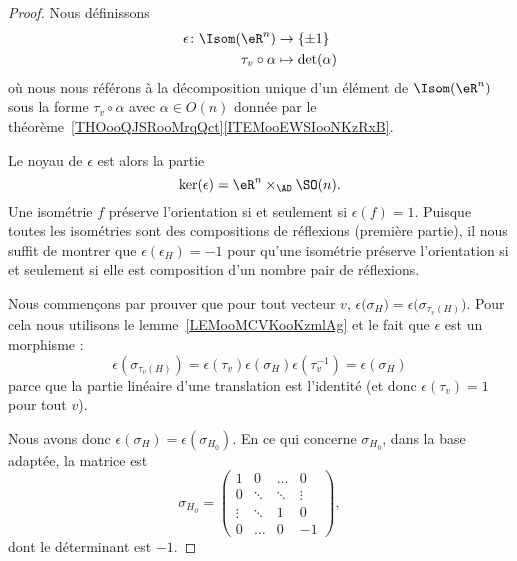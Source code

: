 \begin{proof}
	Nous définissons
	\begin{equation}
		\begin{aligned}
			\epsilon\colon \Isom(\eR^n) & \to \{ \pm 1 \}      \\
			\tau_v\circ \alpha          & \mapsto \det(\alpha)
		\end{aligned}
	\end{equation}
	où nous nous référons à la décomposition unique d'un élément de \( \Isom(\eR^n)\) sous la forme \( \tau_v\circ \alpha\) avec \( \alpha\in O(n)\) donnée par le théorème~\ref{THOooQJSRooMrqQct}\ref{ITEMooEWSIooNKzRxB}.

	Le noyau de \( \epsilon\) est alors la partie
	\begin{equation}
		\ker(\epsilon)=\eR^n\times_{\AD}\SO(n).
	\end{equation}
	Une isométrie \( f\) préserve l'orientation si et seulement si \( \epsilon(f)=1\). Puisque toutes les isométries sont des compositions de réflexions (première partie), il nous suffit de montrer que \( \epsilon(\epsilon_H)=-1\) pour qu'une isométrie préserve l'orientation si et seulement si elle est composition d'un nombre pair de réflexions.

	Nous commençons par prouver que pour tout vecteur \( v\), \( \epsilon\big( \sigma_H \big)=\epsilon\big( \sigma_{\tau_v(H)} \big)\). Pour cela nous utilisons le lemme~\ref{LEMooMCVKooKzmlAg} et le fait que \( \epsilon\) est un morphisme :
	\begin{equation}
		\epsilon(\sigma_{\tau_v(H)})=\epsilon(\tau_v)\epsilon(\sigma_H)\epsilon(\tau_v^{-1})=\epsilon(\sigma_H)
	\end{equation}
	parce que la partie linéaire d'une translation est l'identité (et donc \( \epsilon(\tau_v)=1\) pour tout \( v\)).

	Nous avons donc \( \epsilon(\sigma_H)=\epsilon(\sigma_{H_0})\). En ce qui concerne \( \sigma_{H_0}\), dans la base adaptée, la matrice est
	\begin{equation}
		\sigma_{H_0}=\begin{pmatrix}
			1       &    0    & \dots   &  0      \\
			0       & \ddots  & \ddots  &  \vdots \\
			\vdots  & \ddots  & 1       &  0      \\
			0       & \dots   & 0       & -1
		\end{pmatrix},
	\end{equation}
	dont le déterminant est \( -1\).
\end{proof}

